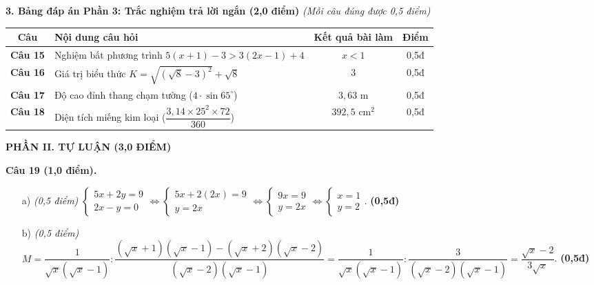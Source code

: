 \documentclass[11pt,a4paper]{article}
\begin{document}
\vspace{2mm}
\noindent
\textbf{3. Bảng đáp án Phần 3: Trắc nghiệm trả lời ngắn (2,0 điểm)} \textit{(Mỗi câu đúng được 0,5 điểm)}
\begin{center}
\begin{tabular}{|c|l|c|c|}
\hline
\textbf{Câu} & \textbf{Nội dung câu hỏi} & \textbf{Kết quả bài làm} & \textbf{Điểm} \\
\hline
\textbf{Câu 15} & Nghiệm bất phương trình $5(x + 1) - 3 > 3(2x - 1) + 4$ & \textbf{$x < 1$} & 0,5đ \\
\hline
\textbf{Câu 16} & Giá trị biểu thức $K = \sqrt{(\sqrt{8}-3)^2} + \sqrt{8}$ & \textbf{$3$} & 0,5đ \\
\hline
\textbf{Câu 17} & Độ cao đỉnh thang chạm tường ($4 \cdot \sin 65^\circ$) & \textbf{$3{,}63\text{ m}$} & 0,5đ \\
\hline
\textbf{Câu 18} & Diện tích miếng kim loại ($\dfrac{3{,}14 \times 25^2 \times 72}{360}$) & \textbf{$392{,}5\text{ cm}^2$} & 0,5đ \\
\hline
\end{tabular}
\end{center}

\vspace{3mm}
\noindent
\textbf{\large PHẦN II. TỰ LUẬN (3,0 ĐIỂM)}

\vspace{2mm}
\textbf{Câu 19 (1,0 điểm).}
\begin{itemize}
  \item[a)] \textit{(0,5 điểm)} $\begin{cases} 5x + 2y = 9 \\ 2x - y = 0 \end{cases} \Leftrightarrow \begin{cases} 5x + 2(2x) = 9 \\ y = 2x \end{cases} \Leftrightarrow \begin{cases} 9x = 9 \\ y = 2x \end{cases} \Leftrightarrow \begin{cases} x = 1 \\ y = 2 \end{cases}$. \hfill \textbf{(0,5đ)}
  \item[b)] \textit{(0,5 điểm)} $M = \dfrac{1}{\sqrt{x}(\sqrt{x}-1)} : \dfrac{(\sqrt{x}+1)(\sqrt{x}-1) - (\sqrt{x}+2)(\sqrt{x}-2)}{(\sqrt{x}-2)(\sqrt{x}-1)} = \dfrac{1}{\sqrt{x}(\sqrt{x}-1)} : \dfrac{3}{(\sqrt{x}-2)(\sqrt{x}-1)} = \dfrac{\sqrt{x}-2}{3\sqrt{x}}$. \hfill \textbf{(0,5đ)}
\end{itemize}
\end{document}
